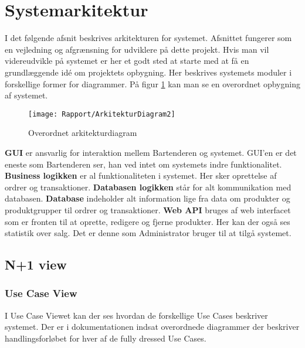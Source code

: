 \newpage
\section{Systemarkitektur}

I det følgende afsnit beskrives arkitekturen for systemet. Afsnittet fungerer som en vejledning og afgrænsning for udviklere på dette projekt. Hvis man vil videreudvikle på systemet er her et godt sted at starte med at få en grundlæggende idé om projektets opbygning. Her beskrives systemets moduler i forskellige former for diagrammer. På figur \ref{ArkiDia} kan man se en overordnet opbygning af systemet.

\begin{figure}[H]
	\centering
	\texttt{[image: Rapport/ArkitekturDiagram2]}
	\caption{Overordnet arkitekturdiagram}
	\label{ArkiDia}
\end{figure}

\textbf{GUI} er ansvarlig for interaktion mellem Bartenderen og systemet. \gls{GUI}'en er det eneste som Bartenderen ser, han ved intet om systemets indre funktionalitet.
\newline\newline
\textbf{Business logikken} er al funktionaliteten i systemet. Her sker oprettelse af ordrer og transaktioner.
\newline\newline
\textbf{Databasen logikken} står for alt kommunikation med databasen. 
\newline\newline
\textbf{Database} indeholder alt information lige fra data om produkter og produktgrupper til ordrer og transaktioner.
\newline\newline
\textbf{Web API} bruges af web interfacet som er fronten til at oprette, redigere og fjerne produkter. Her kan der også ses statistik over salg. Det er denne som Administrator bruger til at tilgå systemet. 

\subsection{N+1 view}

\subsubsection{Use Case View}
I Use Case Viewet kan der ses hvordan de forskellige Use Cases beskriver systemet. Der er i dokumentationen indsat overordnede diagrammer der beskriver handlingsforløbet for hver af de fully dressed Use Cases.

